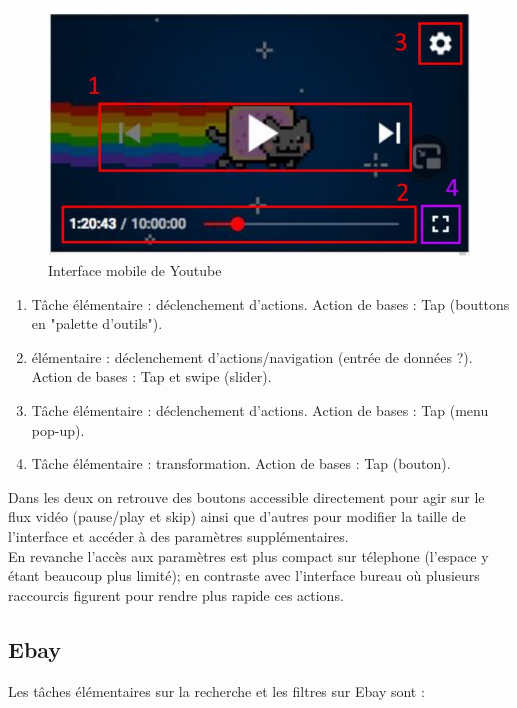 \documentclass{article}
\begin{document}
\begin{figure}[H]
    \centering
    \includegraphics[width=0.8\linewidth]{Youtube_mobile.jpeg}
    \caption{Interface mobile de Youtube}
\end{figure}

\vspace{1cm}

\begin{enumerate}[label=\arabic*)]
    \item Tâche élémentaire : déclenchement d'actions. Action de bases : Tap (bouttons en "palette d'outils").
    \item  élémentaire : déclenchement d'actions/navigation (entrée de données ?). Action de bases : Tap et swipe (slider).
    \item  Tâche élémentaire : déclenchement d'actions. Action de bases : Tap (menu pop-up).
    \item  Tâche élémentaire : transformation. Action de bases : Tap (bouton).
\end{enumerate}

\vspace{2cm}

Dans les deux on retrouve des boutons accessible directement pour agir sur le flux vidéo (pause/play et skip) ainsi que d'autres pour modifier la taille de l'interface et accéder à des paramètres supplémentaires.\\
En revanche l'accès aux paramètres est plus compact sur télephone (l'espace y étant beaucoup plus limité); en contraste avec l'interface bureau où plusieurs raccourcis figurent pour rendre plus rapide ces actions.



\clearpage

\subsection{Ebay}
\quad Les tâches élémentaires sur la recherche et les filtres sur Ebay sont :\newline
\end{document}
